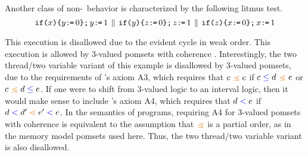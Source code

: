 Another class of non-\mca\ behavior is characterized by the following litmus test.
\begin{displaymath}
  \texttt{if}\allowbreak\texttt{(}x\texttt{)}\allowbreak\texttt{\{} y\texttt{:}\mkern-1mu\texttt{=}\,0 \texttt{\}} \texttt{;}\, y\texttt{:}\mkern-1mu\texttt{=}\,1
  \,\mathbin{\|}\,
  \texttt{if}\allowbreak\texttt{(}y\texttt{)}\allowbreak\texttt{\{} z\texttt{:}\mkern-1mu\texttt{=}\,0 \texttt{\}} \texttt{;}\, z\texttt{:}\mkern-1mu\texttt{=}\,1
  \,\mathbin{\|}\,
  \texttt{if}\allowbreak\texttt{(}z\texttt{)}\allowbreak\texttt{\{} x\texttt{:}\mkern-1mu\texttt{=}\,0 \texttt{\}} \texttt{;}\, x\texttt{:}\mkern-1mu\texttt{=}\,1
\end{displaymath}
\begin{tikzdisplay}[node distance=1em]
\end{tikzdisplay}
This execution is disallowed due to the evident cycle in weak order.  This
execution is allowed by 3-valued pomsets with coherence \citep{2019-sp}.
Interestingly, the two thread/two variable variant of this example is
disallowed by 3-valued pomsets, due to the requirements of
\citeauthor{DBLP:journals/dc/Lamport86}'s axiom A3, which requires that
$\cEv \gtN \aEv$ if $\cEv \le \bEv \gtN \aEv$ or $\cEv \gtN \bEv \le \aEv$.
If one were to shift from 3-valued logic to an interval logic, then it would
make sense to include \citeauthor{DBLP:journals/dc/Lamport86}'s axiom A4,
which requires that $d \mathrel{{\color{blue}<}} e$ if $\bEv \lt \bEv' \geN \aEv' \lt \aEv$.
In the semantics of programs, requiring A4 for 3-valued pomsets with
coherence is equivalent to the assumption that $\gtN$ is a partial order, as
in the memory model pomsets used here.  Thus, the two thread/two variable
variant is also disallowed.

